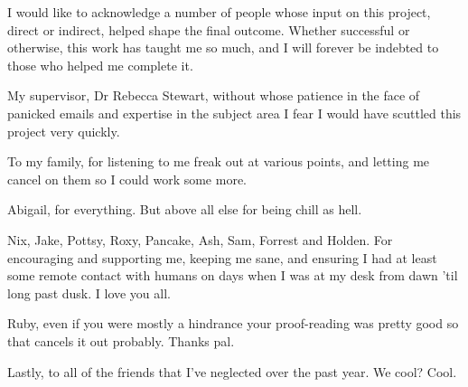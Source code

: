 \noindent
I would like to acknowledge a number of people whose input on this project, direct or indirect, helped shape the final outcome. Whether successful or otherwise, this work has taught me so much, and I will forever be indebted to those who helped me complete it.

\bigskip
\noindent
My supervisor, Dr Rebecca Stewart, without whose patience in the face of panicked emails and expertise in the subject area I fear I would have scuttled this project very quickly. 

\bigskip
\noindent
To my family, for listening to me freak out at various points, and letting me cancel on them so I could work some more.

\bigskip
\noindent
Abigail, for everything. But above all else for being chill as hell. 

\bigskip
\noindent
Nix, Jake, Pottsy, Roxy, Pancake, Ash, Sam, Forrest and Holden. For encouraging and supporting me, keeping me sane, and ensuring I had at least some remote contact with humans on days when I was at my desk from dawn 'til long past dusk. I love you all. 

\bigskip
\noindent	
Ruby, even if you were mostly a hindrance your proof-reading was pretty good so that cancels it out probably. Thanks pal.   

\bigskip 
\noindent
Lastly, to all of the friends that I've neglected over the past year. We cool? Cool.